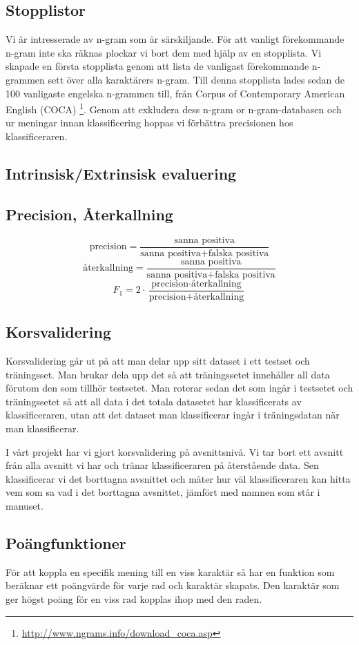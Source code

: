 \documentclass[a4paper]{article}
\begin{document}
\subsection{Stopplistor}
Vi är intresserade av n-gram som är särskiljande. För att vanligt
förekommande n-gram inte ska räknas plockar vi bort dem med hjälp av
en stopplista. Vi skapade en första stopplista genom att lista de
vanligast förekommande n-grammen sett över alla karaktärers n-gram.
Till denna stopplista lades sedan de 100 vanligaste engelska n-grammen
till, från Corpus of Contemporary American English (COCA)
\footnote{\url{http://www.ngrams.info/download_coca.asp}}. Genom att
exkludera dess n-gram or n-gram-databasen och ur meningar innan
klassificering hoppas vi förbättra precisionen hos klassificeraren.

\subsection{Intrinsisk/Extrinsisk evaluering}
\subsection{Precision, Återkallning}
\[\mathrm{precision}=\dfrac{\text{sanna positiva}}{\text{sanna positiva} + \text{falska positiva}}\]
\[\text{återkallning}=\dfrac{\text{sanna positiva}}{\text{sanna positiva} + \text{falska positiva}}\]
\[F_1 = 2 \cdot \dfrac{\text{precision} \cdot \text{återkallning}}{\text{precision} + \text{återkallning}}\]

\subsection{Korsvalidering}
Korsvalidering går ut på att man delar upp sitt dataset i ett testset
och träningsset. Man brukar dela upp det så att träningssetet
innehåller all data förutom den som tillhör testsetet. Man roterar
sedan det som ingår i testsetet och träningssetet så att all data i
det totala datasetet har klassificerats av klassificeraren, utan att
det dataset man klassificerar ingår i träningsdatan när man
klassificerar.

I vårt projekt har vi gjort korsvalidering på avsnittsnivå. Vi tar
bort ett avsnitt från alla avsnitt vi har och tränar klassificeraren
på återstående data. Sen klassificerar vi det borttagna avsnittet och
mäter hur väl klassificeraren kan hitta vem som sa vad i det borttagna
avsnittet, jämfört med namnen som står i manuset.

\subsection{Poängfunktioner}
För att koppla en specifik mening till en viss karaktär så har en
funktion som beräknar ett poängvärde för varje rad och karaktär
skapats. Den karaktär som ger högst poäng för en viss rad kopplas ihop
med den raden.
\end{document}
